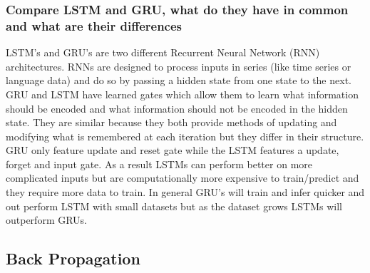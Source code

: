 \documentclass[11pt]{article}
\begin{document}
\subsubsection{Compare LSTM and GRU, what do they have in common and what are their differences}
LSTM's and GRU's are two different Recurrent Neural Network (RNN) architectures. RNNs are designed to process inputs in series (like time series or language data) and do so by passing a hidden state from one state to the next. GRU and LSTM have learned gates which allow them to learn what information should be encoded and what information should not be encoded in the hidden state. They are similar because they both provide methods of updating and modifying what is remembered at each iteration but they differ in their structure. GRU only feature update and reset gate while the LSTM features a update, forget and input gate. As a result LSTMs can perform better on more complicated inputs but are computationally more expensive to train/predict and they require more data to train. In general GRU's will train and infer quicker and out perform LSTM with small datasets but as the dataset grows LSTMs will outperform GRUs.
\subsection{Back Propagation}
\end{document}
